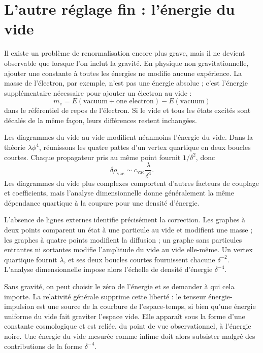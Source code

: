 \section{L’autre réglage fin : l’énergie du vide}

Il existe un problème de renormalisation encore plus grave, mais il ne devient observable que lorsque l’on inclut la gravité. En physique non gravitationnelle, ajouter une constante à toutes les énergies ne modifie aucune expérience. La masse de l’électron, par exemple, n’est pas une énergie absolue ; c’est l’énergie supplémentaire nécessaire pour ajouter un électron au vide :
\begin{equation}
m_e=E(\text{vacuum}+\text{one electron})-E(\text{vacuum})
\end{equation}
dans le référentiel de repos de l’électron. Si le vide et tous les états excités sont décalés de la même façon, leurs différences restent inchangées.

Les diagrammes du vide au vide modifient néanmoins l’énergie du vide. Dans la théorie \(\lambda\phi^4\), réunissons les quatre pattes d’un vertex quartique en deux boucles courtes. Chaque propagateur pris au même point fournit \(1/\delta^2\), donc
\begin{equation}
\delta\rho_{\mathrm{vac}}
\sim
c_{\mathrm{vac}}\frac{\lambda}{\delta^4}.
\label{eq:vacuum-energy-divergence}
\end{equation}
Les diagrammes du vide plus complexes comportent d’autres facteurs de couplage et coefficients, mais l’analyse dimensionnelle donne généralement la même dépendance quartique à la coupure pour une densité d’énergie.

L’absence de lignes externes identifie précisément la correction. Les graphes à deux points comparent un état à une particule au vide et modifient une masse ; les graphes à quatre points modifient la diffusion ; un graphe sans particules entrantes ni sortantes modifie l’amplitude du vide au vide elle-même. Un vertex quartique fournit \(\lambda\), et ses deux boucles courtes fournissent chacune \(\delta^{-2}\). L’analyse dimensionnelle impose alors l’échelle de densité d’énergie \(\delta^{-4}\).

Sans gravité, on peut choisir le zéro de l’énergie et se demander à qui cela importe. La relativité générale supprime cette liberté : le tenseur énergie-impulsion est une source de la courbure de l’espace-temps, si bien qu’une énergie uniforme du vide fait graviter l’espace vide. Elle apparaît sous la forme d’une constante cosmologique et est reliée, du point de vue observationnel, à l’énergie noire. Une énergie du vide mesurée comme infime doit alors subsister malgré des contributions de la forme \(\delta^{-4}\).

